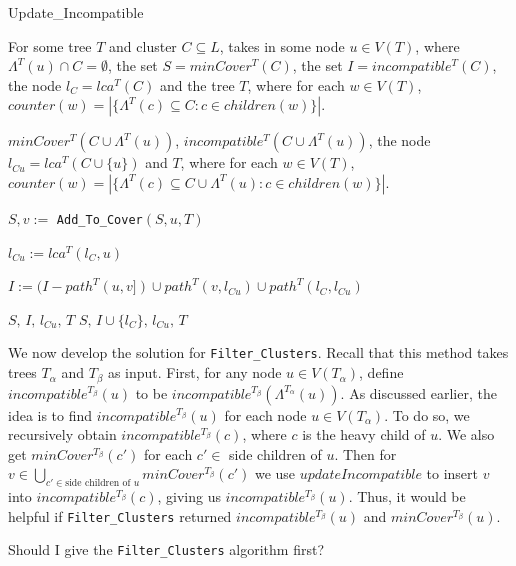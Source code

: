 \documentclass{article}
\newcommand{\leafset}{\Lambda}
\newcommand{\TA}{T_\alpha}
\newcommand{\TB}{T_\beta}
\begin{document}
    \begin{algorithm}
        \caption{Update\_Incompatible}
        \label{alg:updateincompatible}

        \begin{algorithmic}[1]
            \Input For some tree $T$ and cluster $C \subseteq L$, takes in some node $u \in V(T)$, where $\leafset^{T}(u) \cap C = \emptyset$, the set $S = minCover^{T}(C)$, the set $I = incompatible^{T}(C)$, the node $l_C = lca^{T}(C)$ and the tree $T$, where for each $w \in V(T)$, $counter(w) = |\{\leafset^{T}(c) \subseteq C : c \in children(w)\}|$.

            \Output $minCover^{T}(C \cup \leafset^{T}(u))$, $incompatible^{T}(C \cup \leafset^{T}(u))$, the node $l_{Cu} = lca^{T}(C \cup \{u\})$ and $T$, where for each $w \in V(T)$, $counter(w) = |\{\leafset^{T}(c) \subseteq C \cup \leafset^{T}(u) : c \in children(w)\}|$.

            \State $S, v :=$ \texttt{Add\_To\_Cover}$(S, u, T)$

            \State $l_{Cu} := lca^T(l_C, u)$

            \State $I := (I - path^{T}(u, v]) \cup path^{T}(v, l_{Cu}) \cup path^{T}(l_C, l_{Cu})$

                \State \Return $S,\, I,\, l_{Cu},\, T$
            \Else
                \State \Return $S,\, I \cup \{l_C\},\, l_{Cu},\, T$
            \EndIf
        \end{algorithmic}
    \end{algorithm}

    We now develop the solution for \texttt{Filter\_Clusters}. Recall that this method takes trees $\TA$ and $\TB$ as input. First, for any node $u \in V(\TA)$, define $incompatible^{\TB}(u)$ to be $incompatible^{\TB}(\leafset^{\TA}(u))$. As discussed earlier, the idea is to find $incompatible^{\TB}(u)$ for each node $u \in V(\TA)$. To do so, we recursively obtain $incompatible^{\TB}(c)$, where $c$ is the heavy child of $u$. We also get $minCover^{\TB}(c')$ for each $c' \in$ side children of $u$. Then for $v \in \bigcup_{c' \in \text{side children of } u} minCover^{\TB}(c')$ we use $updateIncompatible$ to insert $v$ into $incompatible^{\TB}(c)$, giving us $incompatible^{\TB}(u)$. Thus, it would be helpful if \texttt{Filter\_Clusters} returned $incompatible^{\TB}(u)$ and $minCover^{\TB}(u)$.

    {\color{red} Should I give the \texttt{Filter\_Clusters} algorithm first?}
\end{document}
